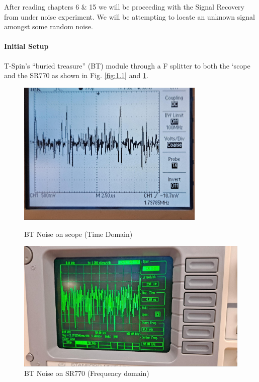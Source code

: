 \documentclass[../main.tex]{subfiles}
\begin{document}
After reading chapters 6 \& 15 we will be proceeding with the Signal Recovery from under noise experiment. We will be attempting to locate an unknown signal amongst some random noise.

\paragraph*{Initial Setup}

T-Spin's ``buried treasure'' (BT) module through a F splitter to both the ‘scope and the SR770 as shown in Fig. \ref{fig:1.1} and \ref{fig:1.2}.

\begin{figure}[ht]
    \centering
    \begin{minipage}{0.5\textwidth}
        \centering
        \includegraphics[width=0.8\textwidth]{fig1_1a.jpg}
        \caption{BT Noise on scope (Time Domain)}
        \label{fig:1.1}
    \end{minipage}\hfill
    \begin{minipage}{0.5\textwidth}
        \centering
        \includegraphics[width=\textwidth]{fig1_1b.jpg}
        \caption{BT Noise on SR770 (Frequency domain)}
        \label{fig:1.2}
    \end{minipage}
\end{figure}
\end{document}

